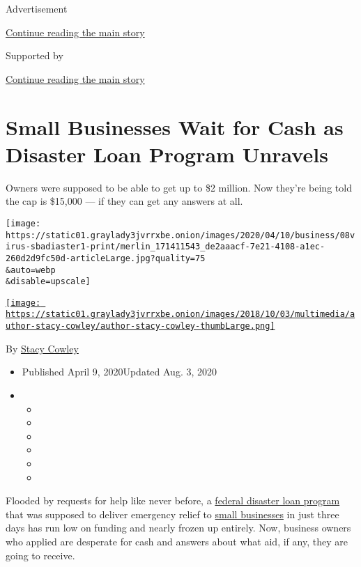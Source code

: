 Advertisement

\protect\hyperlink{after-top}{Continue reading the main story}

Supported by

\protect\hyperlink{after-sponsor}{Continue reading the main story}

\hypertarget{small-businesses-wait-for-cash-as-disaster-loan-program-unravels}{%
\section{Small Businesses Wait for Cash as Disaster Loan Program
Unravels}\label{small-businesses-wait-for-cash-as-disaster-loan-program-unravels}}

Owners were supposed to be able to get up to \$2 million. Now they're
being told the cap is \$15,000 --- if they can get any answers at all.

\texttt{[image: https://static01.graylady3jvrrxbe.onion/images/2020/04/10/business/08virus-sbadiaster1-print/merlin\_171411543\_de2aaacf-7e21-4108-a1ec-260d2d9fc50d-articleLarge.jpg?quality=75\\\&auto=webp\\\&disable=upscale]}

\href{https://www.nytimes3xbfgragh.onion/by/stacy-cowley}{\texttt{[image: https://static01.graylady3jvrrxbe.onion/images/2018/10/03/multimedia/author-stacy-cowley/author-stacy-cowley-thumbLarge.png]}}

By \href{https://www.nytimes3xbfgragh.onion/by/stacy-cowley}{Stacy
Cowley}

\begin{itemize}
\item
  Published April 9, 2020Updated Aug. 3, 2020
\item
  \begin{itemize}
  \item
  \item
  \item
  \item
  \item
  \item
  \end{itemize}
\end{itemize}

Flooded by requests for help like never before, a
\href{https://www.nytimes3xbfgragh.onion/2020/08/03/business/small-business-loans-coronavirus.html}{federal
disaster loan program} that was supposed to deliver emergency relief to
\href{https://www.nytimes3xbfgragh.onion/2020/04/20/business/shake-shack-returning-loan-ppp-coronavirus.html}{small
businesses} in just three days has run low on funding and nearly frozen
up entirely. Now, business owners who applied are desperate for cash and
answers about what aid, if any, they are going to receive.

